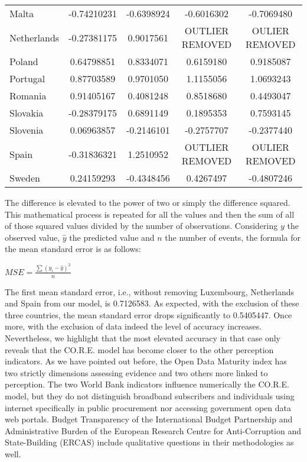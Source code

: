 \documentclass[a4paper, twoside]{report}
\begin{document}
\begin{table}[htbp]
\begin{adjustbox}{max width=\linewidth}
\begin{tabular}{lcc|cc}
    Malta & -0.74210231 & -0.6398924 & -0.6016302 &  -0.7069480 \\
    Netherlands & -0.27381175 & 0.9017561 & OUTLIER REMOVED & OULIER REMOVED \\
    Poland & 0.64798851 & 0.8334071 & 0.6159180 & 0.9185087	 \\
    Portugal & 0.87703589 & 0.9701050 & 1.1155056 & 1.0693243 \\
    Romania & 0.91405167 & 0.4081248 & 0.8518680 & 0.4493047 \\
    Slovakia & -0.28379175 & 0.6891149 & 0.1895353 & 0.7593145 \\
    Slovenia & 0.06963857 & -0.2146101 & -0.2757707 & -0.2377440 \\
    Spain & -0.31836321 & 1.2510952 & OUTLIER REMOVED & OULIER REMOVED \\
    Sweden & 0.24159293 & -0.4348456 & 0.4267497 & -0.4807246	 \\
    \bottomrule
    \end{tabular}%
    \end{adjustbox}
  \label{tab:mean_square_error_table}%
\end{table}%

The difference is elevated to the power of two or simply the difference squared. This mathematical process is repeated for all the values and then the sum of all of those squared values divided by the number of observations. Considering $y$ the observed value, $\hat {y}$ the predicted value and $n$ the number of events, the formula for the mean standard error is as follows:\\

\begin{center}
 $ MSE = \frac{\sum(y_i - \hat{y})^2} {n} $\\
 \end{center}

The first mean standard error, i.e., without removing Luxembourg, Netherlands and Spain from our model, is 0.7126583. As expected, with the exclusion of these three countries, the mean standard error drops significantly to 0.5405447. Once more, with the exclusion of data indeed the level of accuracy increases. Nevertheless, we highlight that the most elevated accuracy in that case only reveals that the CO.R.E. model has become closer to the other perception indicators. As we have pointed out before, the Open Data Maturity index has two strictly dimensions assessing evidence and two others more linked to perception. The two World Bank indicators influence numerically the CO.R.E. model, but they do not distinguish broadband subscribers and individuals using internet specifically in public procurement nor accessing government open data web portals. Budget Transparency of the International Budget Partnership and Administrative Burden of the European Research Centre for Anti-Corruption and State-Building (ERCAS) include qualitative questions in their methodologies as well.\\
\end{document}
